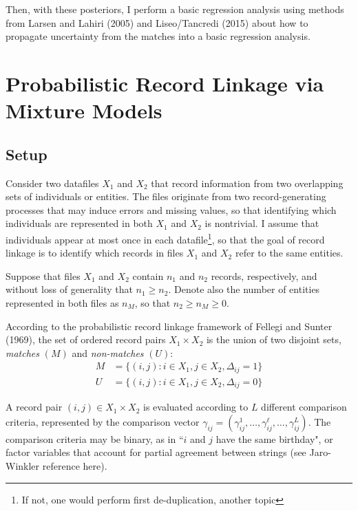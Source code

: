 \documentclass[11pt,reqno]{amsart}
\begin{document}
Then, with these posteriors, I perform a basic regression analysis using methods from Larsen and Lahiri (2005) and Liseo/Tancredi (2015) about how to propagate uncertainty from the matches into a basic regression analysis.   

\section{Probabilistic Record Linkage via Mixture Models}

\subsection{Setup} Consider two datafiles $X_1$ and $X_2$ that record information from two overlapping sets of individuals or entities.  The files originate from two record-generating processes that may induce errors and missing values, so that identifying which individuals are represented in both $X_1$ and $X_2$ is nontrivial.  I assume that individuals appear at most once in each datafile\footnote{If not, one would perform first de-duplication, another topic}, so that the goal of record linkage is to identify which records in files $X_1$ and $X_2$ refer to the same entities.  

Suppose that files $X_1$ and $X_2$ contain $n_1$ and $n_2$ records, respectively, and without loss of generality that $n_1 \geq n_2$.  Denote also the number of entities represented in both files as $n_{M}$, so that $n_2\geq n_M \geq 0$. 

According to the probabilistic record linkage framework of Fellegi and Sunter (1969), the set of ordered record pairs $X_1 \times X_2$ is the union of two disjoint sets, \textit{matches} $(M)$ and \textit{non-matches} $(U)$:
\begin{align*} M &= \{(i,j): i\in X_1, j\in X_2, \Delta_{ij}=1\} \\ U &= \{(i,j): i\in X_1, j\in X_2, \Delta_{ij}=0\}\end{align*} 

A record pair $(i,j) \in X_1\times X_2$ is evaluated according to $L$ different comparison criteria, represented by the comparison vector $\gamma_{ij}= (\gamma_{ij}^1, \dots, \gamma_{ij}^{\ell}, \dots, \gamma_{ij}^L)$.  The comparison criteria may be binary, as in ``$i$ and $j$ have the same birthday", or factor variables that account for partial agreement between strings (see Jaro-Winkler reference here).    %
\end{document}
